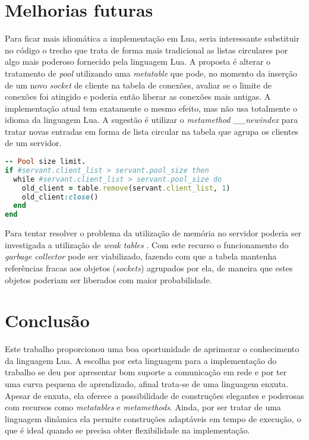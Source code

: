 \documentclass[11pt]{article}
\begin{document}
\section{Melhorias futuras}\label{sec:future}

Para ficar mais idiomática a implementação em Lua, seria interessante substituir
no código o trecho que trata de forma mais tradicional as listas circulares por
algo mais poderoso fornecido pela linguagem Lua. A proposta é alterar o
tratamento de \textit{pool} utilizando uma \textit{metatable} \cite{metat} que
pode, no momento da inserção de um novo \textit{socket} de cliente na tabela de
conexões, avaliar se o limite de conexões foi atingido e poderia então liberar
as conexões mais antigas. A implementação atual tem exatamente o mesmo efeito,
mas não usa totalmente o idioma da linguagem Lua. A sugestão é utilizar o
\textit{metamethod \_\_newindex} para tratar novas entradas em forma de lista
circular na tabela que agrupa os clientes de um servidor.

\begin{lstlisting}[label={connpool},language=Ruby,caption=Connection Pool]
-- Pool size limit.
if #servant.client_list > servant.pool_size then
  while #servant.client_list > servant.pool_size do
    old_client = table.remove(servant.client_list, 1)
    old_client:close()
  end
end
\end{lstlisting}

Para tentar resolver o problema da utilização de memória no servidor poderia ser
investigada a utilização de \textit{weak tables} \cite{weakt}. Com este recurso
o funcionamento do \textit{garbage collector} pode ser viabilizado, fazendo com
que a tabela mantenha referências fracas aos objetos (\textit{sockets})
agrupados por ela, de maneira que estes objetos poderiam ser liberados com maior
probabilidade.

\section{Conclusão}\label{sec:conclusion}

Este trabalho proporcionou uma boa oportunidade de aprimorar o conhecimento da
linguagem Lua. A escolha por esta linguagem para a implementação do trabalho se
deu por apresentar bom suporte a comunicação em rede e por ter uma curva pequena
de aprendizado, afinal trata-se de uma linguagem enxuta. Apesar de enxuta, ela
oferece a possibilidade de construções elegantes e poderosas com recursos como
\textit{metatables} e \textit{metamethods}. Ainda, por ser tratar de uma
linguagem dinâmica ela permite construções adaptáveis em tempo de execução, o
que é ideal quando se precisa obter flexibilidade na implementação.



\end{document}
